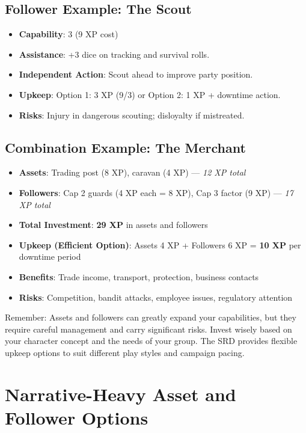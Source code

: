 \subsection*{Follower Example: The Scout}
\begin{itemize}
\item \textbf{Capability}: 3 (9 XP cost)
\item \textbf{Assistance}: +3 dice on tracking and survival rolls.
\item \textbf{Independent Action}: Scout ahead to improve party position.
\item \textbf{Upkeep}: Option 1: 3 XP (9/3) or Option 2: 1 XP + downtime action.
\item \textbf{Risks}: Injury in dangerous scouting; disloyalty if mistreated.
\end{itemize}

\subsection*{Combination Example: The Merchant}
\begin{itemize}
\item \textbf{Assets}: Trading post (8 XP), caravan (4 XP) --- \emph{12 XP total}
\item \textbf{Followers}: Cap 2 guards (4 XP each = 8 XP), Cap 3 factor (9 XP) --- \emph{17 XP total}
\item \textbf{Total Investment}: \textbf{29 XP} in assets and followers
\item \textbf{Upkeep (Efficient Option)}: Assets 4 XP + Followers 6 XP = \textbf{10 XP} per downtime period
\item \textbf{Benefits}: Trade income, transport, protection, business contacts
\item \textbf{Risks}: Competition, bandit attacks, employee issues, regulatory attention
\end{itemize}

Remember: Assets and followers can greatly expand your capabilities, but they require careful management and carry significant risks. Invest wisely based on your character concept and the needs of your group. The SRD provides flexible upkeep options to suit different play styles and campaign pacing.

\section{Narrative-Heavy Asset and Follower Options}

